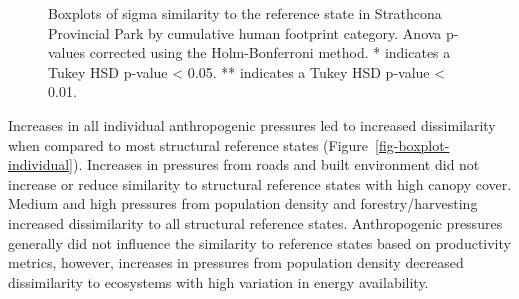 \documentclass[
]{agujournal2019}
\begin{document}
\label{cell-fig-boxplot-overall}
\begin{figure}[H]


\caption{\label{fig-boxplot-overall}Boxplots of sigma similarity to the
reference state in Strathcona Provincial Park by cumulative human
footprint category. Anova p-values corrected using the Holm-Bonferroni
method. * indicates a Tukey HSD p-value \textless{} 0.05. ** indicates a
Tukey HSD p-value \textless{} 0.01.}

\end{figure}%

Increases in all individual anthropogenic pressures led to increased
dissimilarity when compared to most structural reference states
(Figure~\ref{fig-boxplot-individual}). Increases in pressures from roads
and built environment did not increase or reduce similarity to
structural reference states with high canopy cover. Medium and high
pressures from population density and forestry/harvesting increased
dissimilarity to all structural reference states. Anthropogenic
pressures generally did not influence the similarity to reference states
based on productivity metrics, however, increases in pressures from
population density decreased dissimilarity to ecosystems with high
variation in energy availability.
\end{document}
